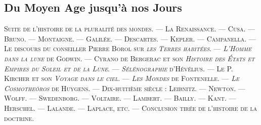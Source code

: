 \documentclass[a4paper, 11pt, oneside, landscape]{article}
\begin{document}
\subsection{Du Moyen Age jusqu'à nos Jours}
\begin{center}
\scshape
\small
Suite de l'histoire de la pluralité des mondes. --- La Renaissance. --- Cusa. --- Bruno. --- Montaigne. --- Galilée. --- Descartes. --- Kepler. --- Campanella. --- Le discours du conseiller Pierre Borol sur \emph{les Terres habitées}. --- \emph{L'Homme dans la lune} de Godwin. --- Cyrano de Bergerac et son \emph{Histoire des États et Empires du Soleil et de la Lune}. --- \emph{Sélénographie} d'Hévélius. --- Le P. Kircher et son \emph{Voyage dans le ciel}. --- \emph{Les Mondes} de Fontenelle. --- \emph{Le Cosmotheôros} de Huygens. --- Dix-huitième siècle : Leibnitz. --- Newton. --- Wolff. --- Swedenborg. --- Voltaire. --- Lambert. --- Bailly. --- Kant. --- Herschel. --- Lalande. --- Laplace, etc. --- Conclusion tirée de l'histoire de la doctrine.
\end{center}
\end{document}
